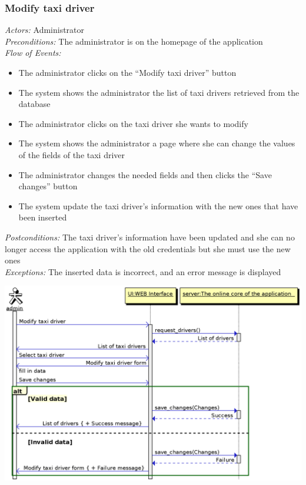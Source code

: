 \documentclass{article}
\begin{document}
\subsubsection{Modify taxi driver}
\textit{Actors:} Administrator
\\\textit{Preconditions:} The administrator is on the homepage of the application
\\\textit{Flow of Events:}
\begin{itemize}
	\item  The administrator clicks on the ``Modify taxi driver'' button
	\item  The system shows the administrator the list of taxi drivers retrieved from the database
	\item  The administrator clicks on the taxi driver she wants to modify
	\item  The system shows the administrator a page where she can change the values of the fields of the taxi driver
	\item  The administrator changes the needed fields and then clicks the ``Save changes'' button
	\item  The system update the taxi driver's information with the new ones that have been inserted
\end{itemize}
\textit{Postconditions:} The taxi driver's information have been updated and she can no longer access the application with the old credentials but she must use the new ones
\\\textit{Exceptions:} The inserted data is incorrect, and an error message is displayed 
\begin{center}	
	\includegraphics[width=\textwidth,keepaspectratio]{Sequence-Diagrams/modify-driver}
\end{center}
\end{document}
